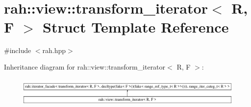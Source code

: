 \hypertarget{structrah_1_1view_1_1transform__iterator}{}\section{rah\+::view\+::transform\+\_\+iterator$<$ R, F $>$ Struct Template Reference}
\label{structrah_1_1view_1_1transform__iterator}


{\ttfamily \#include $<$rah.\+hpp$>$}

Inheritance diagram for rah\+::view\+::transform\+\_\+iterator$<$ R, F $>$\+:\begin{figure}[H]
\begin{center}
\leavevmode
\includegraphics[height=1.458333cm]{structrah_1_1view_1_1transform__iterator}
\end{center}
\end{figure}
